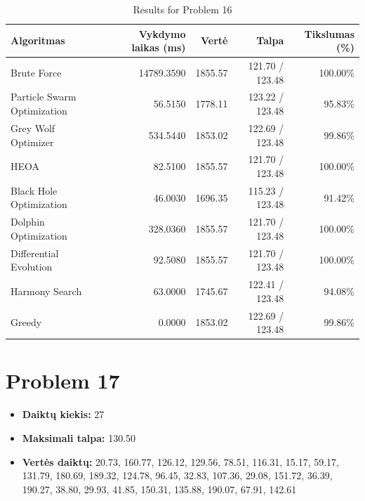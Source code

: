 \documentclass[a4paper,11pt]{article}
\begin{document}
\begin{table}[h!]
\centering
\begin{tabular}{lrrrr}
\toprule
\textbf{Algoritmas} & \textbf{Vykdymo laikas (ms)} & \textbf{Vertė} & \textbf{Talpa} & \textbf{Tikslumas (\%)} \\
\midrule
Brute Force & 14789.3590 & 1855.57 & 121.70 / 123.48 & 100.00\% \\
Particle Swarm Optimization & 56.5150 & 1778.11 & 123.22 / 123.48 & 95.83\% \\
Grey Wolf Optimizer & 534.5440 & 1853.02 & 122.69 / 123.48 & 99.86\% \\
HEOA & 82.5100 & 1855.57 & 121.70 / 123.48 & 100.00\% \\
Black Hole Optimization & 46.0030 & 1696.35 & 115.23 / 123.48 & 91.42\% \\
Dolphin Optimization & 328.0360 & 1855.57 & 121.70 / 123.48 & 100.00\% \\
Differential Evolution & 92.5080 & 1855.57 & 121.70 / 123.48 & 100.00\% \\
Harmony Search & 63.0000 & 1745.67 & 122.41 / 123.48 & 94.08\% \\
Greedy & 0.0000 & 1853.02 & 122.69 / 123.48 & 99.86\% \\
\bottomrule
\end{tabular}
\caption{Results for Problem 16}
\end{table}
\clearpage

\section*{Problem 17}
\begin{itemize}
    \item \textbf{Daiktų kiekis:} 27
    \item \textbf{Maksimali talpa:} 130.50
    \item \textbf{Vertės daiktų:} 20.73, 160.77, 126.12, 129.56, 78.51, 116.31, 15.17, 59.17, 131.79, 180.69, 189.32, 124.78, 96.45, 32.83, 107.36, 29.08, 151.72, 36.39, 190.27, 38.80, 29.93, 41.85, 150.31, 135.88, 190.07, 67.91, 142.61
\end{itemize}
\end{document}
